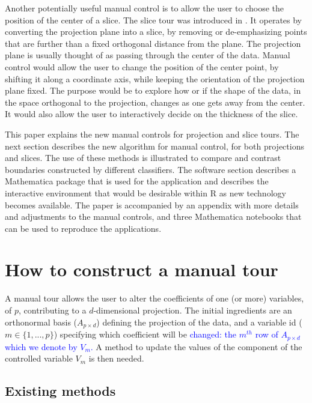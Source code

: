 \documentclass[]{interact}
\theoremstyle{plain}%
\theoremstyle{definition}
\theoremstyle{remark}
\begin{document}
Another potentially useful manual control is to allow the user to choose
the position of the center of a slice. The slice tour was introduced in
\citet{slicetour}. It operates by converting the projection plane into a
slice, by removing or de-emphasizing points that are further than a
fixed orthogonal distance from the plane. The projection plane is
usually thought of as passing through the center of the data. Manual
control would allow the user to change the position of the center point,
by shifting it along a coordinate axis, while keeping the orientation of
the projection plane fixed. The purpose would be to explore how or if
the shape of the data, in the space orthogonal to the projection,
changes as one gets away from the center. It would also allow the user
to interactively decide on the thickness of the slice.

This paper explains the new manual controls for projection and slice
tours. The next section describes the new algorithm for manual control,
for both projections and slices. The use of these methods is illustrated
to compare and contrast boundaries constructed by different classifiers.
The software section describes a Mathematica \citep{Mathematica} package
that is used for the application and describes the interactive
environment that would be desirable within R \citep{rref} as new
technology becomes available. The paper is accompanied by an appendix
with more details and adjustments to the manual controls, and three
Mathematica notebooks that can be used to reproduce the applications.

\hypertarget{sec:method}{%
\section{How to construct a manual tour}\label{sec:method}}

A manual tour allows the user to alter the coefficients of one (or more)
variables, of \(p\), contributing to a \(d\)-dimensional projection. The
initial ingredients are an orthonormal basis (\(A_{p\times d}\))
defining the projection of the data, and a variable id
(\(m \in \{1, ..., p\}\)) specifying which coefficient will be
\textcolor{blue}{changed: the $m^{th}$ row of $A_{p\times d}$ which we denote by $V_m$.}
A method to update the values of the component of the controlled
variable \(V_m\) is then needed.

\hypertarget{existing-methods}{%
\subsection{Existing methods}\label{existing-methods}}
\end{document}
